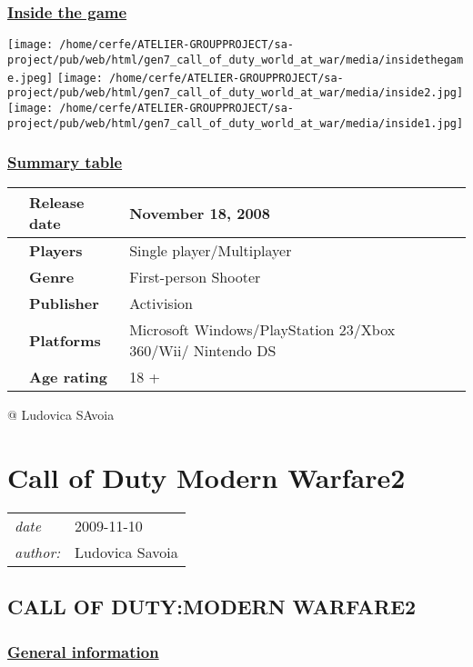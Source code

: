 \documentclass[a4paper,10pt]{book}
\newcommand{\pageHeader}[4]{
    \section{#1}
    \vspace{-0.3cm}
    \begin{table}[h!]
     \begin{tabular}{ll}
        \hline
        \textit{date} & #2 \\
        \textit{author: } & #3\\
        \hline
     \end{tabular}
    \end{table}
    \vspace{-0.3cm}
}
\begin{document}
 \subsubsection{\underline{Inside the game }}
 \texttt{[image: /home/cerfe/ATELIER-GROUPPROJECT/sa-project/pub/web/html/gen7\_call\_of\_duty\_world\_at\_war/media/insidethegame.jpeg]}
 \texttt{[image: /home/cerfe/ATELIER-GROUPPROJECT/sa-project/pub/web/html/gen7\_call\_of\_duty\_world\_at\_war/media/inside2.jpg]}
 \texttt{[image: /home/cerfe/ATELIER-GROUPPROJECT/sa-project/pub/web/html/gen7\_call\_of\_duty\_world\_at\_war/media/inside1.jpg]}
 \subsubsection{\underline{Summary table }}
 \begin{longtable}{p{1mm}|l|l|}\hline
 
 & \textbf{Release date } 
 & November 18, 2008 
 \\\hline
 
 & \textbf{Players } 
 & Single player/Multiplayer 
 \\\hline
 
 & \textbf{Genre } 
 & First-person Shooter 
 \\\hline
 
 & \textbf{Publisher } 
 & Activision 
 \\\hline
 
 & \textbf{Platforms } 
 & Microsoft Windows/PlayStation 23/Xbox 360/Wii/ Nintendo DS 
 \\\hline
 
 & \textbf{Age rating } 
 & 18 + 
 \\\hline
 \end{longtable}
 
 @ Ludovica SAvoia 
 
 \newpage\pageHeader{Call of Duty Modern Warfare2}{2009-11-10}{Ludovica Savoia}{Sixth of the Call of Duty series but first as videogame}
 \subsection{CALL OF DUTY:MODERN WARFARE2 }
 \subsubsection{\underline{General information }}
 
\end{document}
